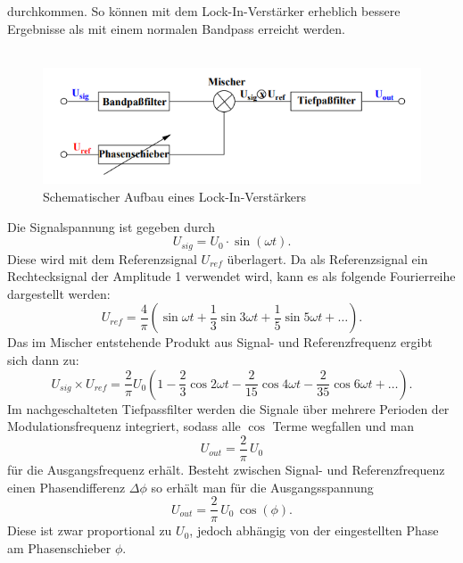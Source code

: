 durchkommen. So können mit dem Lock-In-Verstärker erheblich bessere Ergebnisse als mit einem normalen Bandpass erreicht werden.\\
\\
\begin{figure}[H]
    \centering
    \includegraphics[width=1\textwidth]{img/abb1.png}
    \caption{Schematischer Aufbau eines Lock-In-Verstärkers\protect\footnotemark}
    \label{fig:abb1}
\end{figure}
Die Signalspannung ist gegeben durch
\begin{equation}
    U_{sig} = U_0 \cdot \sin(\omega t).
\end{equation}
Diese wird mit dem Referenzsignal $U_{ref}$ überlagert. Da als Referenzsignal ein Rechtecksignal der Amplitude 1 verwendet wird, kann es als folgende Fourierreihe
dargestellt werden:
\begin{equation}\label{eqn:referenzFrequenz}
    U_{ref} = \frac{4}{\pi}\left(\sin{ωt} + \frac{1}{3}\sin{3ωt} + \frac{1}{5}\sin{5ωt} + \ldots\right).
\end{equation}
\newpage
Das im Mischer entstehende Produkt aus Signal- und Referenzfrequenz ergibt sich dann zu:
\begin{equation}\label{eqn:produkt}
    U_{sig} \times U_{ref} = \frac{2}{π}U_0\left( 1 - \frac{2}{3}\cos{2ωt} - \frac{2}{15}\cos{4ωt} - \frac{2}{35}\cos{6ωt} + \ldots\right).
\end{equation}
Im nachgeschalteten Tiefpassfilter werden die Signale über mehrere Perioden der Modulationsfrequenz integriert, sodass alle $\cos$ Terme wegfallen und man
\begin{equation}
    U_{out} = \frac{2}{\pi}\,U_0
\end{equation}
für die Ausgangsfrequenz erhält. Besteht zwischen Signal- und Referenzfrequenz einen Phasendifferenz $\Delta \phi$ so erhält man für die Ausgangsspannung
\begin{equation}
    U_{out} = \frac{2}{\pi}\,U_0\,\cos(\phi).
\end{equation}
Diese ist zwar proportional zu $U_0$, jedoch abhängig von der eingestellten Phase am Phasenschieber $\phi$.